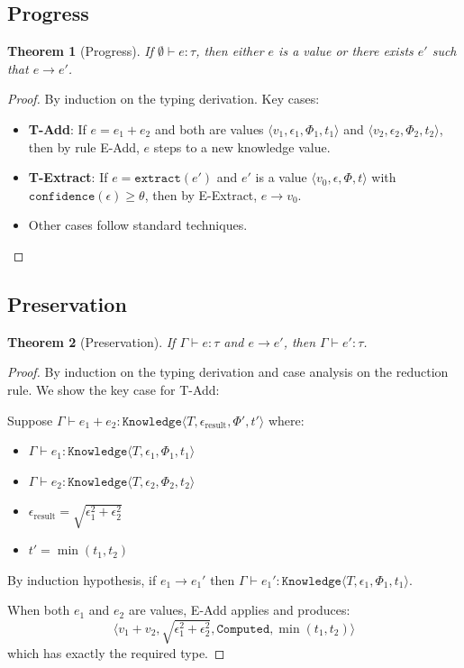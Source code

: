 \documentclass[11pt]{article}
\newtheorem{theorem}{Theorem}
\begin{document}
\subsection{Progress}
\begin{theorem}[Progress]
If $\emptyset \vdash e : \tau$, then either $e$ is a value or there exists $e'$ such that $e \longrightarrow e'$.
\end{theorem}

\begin{proof}
By induction on the typing derivation. Key cases:
\begin{itemize}
\item \textbf{T-Add}: If $e = e_1 + e_2$ and both are values $\langle v_1, \epsilon_1, \Phi_1, t_1 \rangle$ and $\langle v_2, \epsilon_2, \Phi_2, t_2 \rangle$, then by rule E-Add, $e$ steps to a new knowledge value.
\item \textbf{T-Extract}: If $e = \texttt{extract}(e')$ and $e'$ is a value $\langle v_0, \epsilon, \Phi, t \rangle$ with $\texttt{confidence}(\epsilon) \geq \theta$, then by E-Extract, $e \longrightarrow v_0$.
\item Other cases follow standard techniques.
\end{itemize}
\end{proof}

\subsection{Preservation}
\begin{theorem}[Preservation]
If $\Gamma \vdash e : \tau$ and $e \longrightarrow e'$, then $\Gamma \vdash e' : \tau$.
\end{theorem}

\begin{proof}
By induction on the typing derivation and case analysis on the reduction rule. We show the key case for T-Add:

Suppose $\Gamma \vdash e_1 + e_2 : \texttt{Knowledge}\langle T, \epsilon_{\text{result}}, \Phi', t' \rangle$ where:
\begin{itemize}
\item $\Gamma \vdash e_1 : \texttt{Knowledge}\langle T, \epsilon_1, \Phi_1, t_1 \rangle$
\item $\Gamma \vdash e_2 : \texttt{Knowledge}\langle T, \epsilon_2, \Phi_2, t_2 \rangle$
\item $\epsilon_{\text{result}} = \sqrt{\epsilon_1^2 + \epsilon_2^2}$
\item $t' = \min(t_1, t_2)$
\end{itemize}

By induction hypothesis, if $e_1 \longrightarrow e_1'$ then $\Gamma \vdash e_1' : \texttt{Knowledge}\langle T, \epsilon_1, \Phi_1, t_1 \rangle$.

When both $e_1$ and $e_2$ are values, E-Add applies and produces:
\[
\langle v_1 + v_2, \sqrt{\epsilon_1^2 + \epsilon_2^2}, \texttt{Computed}, \min(t_1, t_2) \rangle
\]
which has exactly the required type.
\end{proof}
\end{document}
